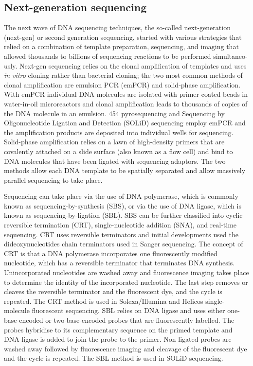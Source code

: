\subsection{Next-generation sequencing}

The next wave of DNA sequencing techniques, the so-called next-generation (next-gen) or second generation sequencing, started with various strategies that relied on a combination of template preparation, sequencing, and imaging that allowed thousands to billions of sequencing reactions to be performed simultaneo-usly\cite{pmid19997069}. Next-gen sequencing relies on the clonal amplification of templates and uses \textit{in vitro} cloning rather than bacterial cloning; the two most common methods of clonal amplification are emulsion PCR (emPCR)\cite{pmid12857956} and solid-phase amplification\cite{pmid16473845}. With emPCR individual DNA molecules are isolated with primer-coated beads in water-in-oil microreactors and clonal amplification leads to thousands of copies of the DNA molecule in an emulsion. 454 pyrosequencing and Sequencing by Oligonucleotide Ligation and Detection (SOLiD) sequencing employ emPCR and the amplification products are deposited into individual wells for sequencing. Solid-phase amplification relies on a lawn of high-density primers that are covalently attached on a slide surface (also known as a flow cell) and bind to DNA molecules that have been ligated with sequencing adaptors. The two methods allow each DNA template to be spatially separated and allow massively parallel sequencing to take place.

Sequencing can take place via the use of DNA polymerase, which is commonly known as sequencing-by-synthesis (SBS), or via the use of DNA ligase, which is known as sequencing-by-ligation (SBL). SBS can be further classified into cyclic reversible termination (CRT), single-nucleotide addition (SNA), and real-time sequencing\cite{pmid19997069}. CRT uses reversible terminators and initial developments used the dideoxynucleotides chain terminators used in Sanger sequencing. The concept of CRT is that a DNA polymerase incorporates one fluorescently modified nucleotide, which has a reversible terminator that terminates DNA synthesis. Unincorporated nucleotides are washed away and fluorescence imaging takes place to determine the identity of the incorporated nucleotide. The last step removes or cleaves the reversible terminator and the fluorescent dye, and the cycle is repeated. The CRT method is used in Solexa/Illumina and Helicos single-molecule fluorescent sequencing. SBL relies on DNA ligase and uses either one-base-encoded or two-base-encoded probes that are fluorescently labelled. The probes hybridise to its complementary sequence on the primed template and DNA ligase is added to join the probe to the primer. Non-ligated probes are washed away followed by fluorescence imaging and cleavage of the fluorescent dye and the cycle is repeated. The SBL method is used in SOLiD sequencing.

